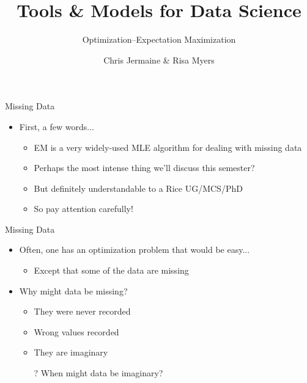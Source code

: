 \documentclass[aspectratio=169]{beamer}
\title[]
{Tools \& Models for Data Science}
\subtitle{Optimization--Expectation Maximization}
\author[]{Chris Jermaine \& Risa Myers}
\institute
{
  Rice University 
}
\date[]{}
\begin{document}
\begin{frame}
 \titlepage
\end{frame}

\begin{frame}{Missing Data}

\begin{itemize}
\item First, a few words...
	\begin{itemize}
	\item EM is a very widely-used MLE algorithm for dealing with missing data
	\item Perhaps the most intense thing we'll discuss this semester?
	\item But definitely understandable to a Rice UG/MCS/PhD
	\item So pay attention carefully!	
	\end{itemize}
\end{itemize}
\end{frame}
\begin{frame}{Missing Data}

\begin{itemize}
\item Often, one has an optimization problem that would be easy...
	\begin{itemize}
	\item Except that some of the data are missing
	\end{itemize}
\item Why might data be missing?
	\begin{itemize}
	\item They were never recorded
	\item Wrong values recorded %
	\item They are imaginary
	\end{itemize}
\begin{itemize}
\item[?] When might data be imaginary?
\end{itemize}
\end{itemize}
\end{frame}
\end{document}
